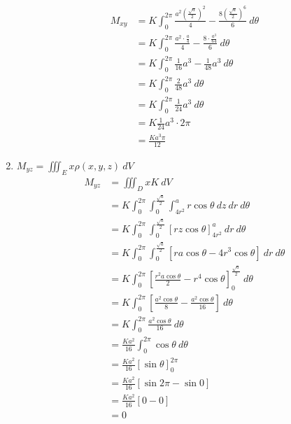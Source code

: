 \documentclass[12pt]{exam}
\begin{document}
\begin{questions}
\begin{enumerate}
    \begin{align*}
      M_{xy}
      &= K \int_0^{2\pi} \frac{a^2\left(\frac{\sqrt{a}}{2}\right)^2}{4} - \frac{8\left(\frac{\sqrt{a}}{2}\right)^6}{6}  ~ d\theta \\
      &= K \int_0^{2\pi} \frac{a^2\cdot \frac{a}{4}}{4} - \frac{8\cdot \frac{a^3}{64}}{6}  ~ d\theta \\
      &= K \int_0^{2\pi} \frac{1}{16} a ^3 - \frac{1}{48}a^3  ~ d\theta \\
      &= K \int_0^{2\pi} \frac{2}{48}a^3  ~ d\theta \\
      &= K \int_0^{2\pi} \frac{1}{24}a^3  ~ d\theta \\
      &=K \frac{1}{24}a^3  \cdot 2\pi \\
      &= \frac{K a^3 \pi}{12}
    \end{align*}

  \item $M_{yz} = \iiint_E x \rho (x,y,z) ~ dV$
    \begin{align*}
      M_{yz}
      &= \iiint_D x K ~ dV \\
      &= K \int_0^{2\pi} \int_0^{\frac{\sqrt{a}}{2}} \int_{4r^2}^a r\cos{\theta} ~ dz ~ dr ~ d\theta \\
      &= K \int_0^{2\pi} \int_0^{\frac{\sqrt{a}}{2}} \left[ rz\cos{\theta} \right]_{4r^2}^a ~ dr ~ d\theta \\
      &= K \int_0^{2\pi} \int_0^{\frac{\sqrt{a}}{2}} \left[ ra\cos{\theta} - 4r^3\cos{\theta} \right] ~ dr ~ d\theta \\
      &= K \int_0^{2\pi} \left[ \frac{r^2a\cos{\theta}}{2} - r^4\cos{\theta} \right]_0^{\frac{\sqrt{a}}{2}} ~ d\theta \\
      &= K \int_0^{2\pi} \left[ \frac{a^2\cos{\theta}}{8} - \frac{a^2\cos{\theta}}{16} \right] ~ d\theta\\
      &= K \int_0^{2\pi} \frac{a^2\cos{\theta}}{16}  ~ d\theta \\
      &= \frac{K a^2}{16} \int_0^{2\pi} \cos{\theta}  ~ d\theta \\
      &= \frac{K a^2}{16} \left[ \sin{\theta} \right]_0^{2\pi} \\
      &= \frac{K a^2}{16} \left[ \sin{2\pi} - \sin{0} \right] \\
      &= \frac{K a^2}{16} \left[ 0 - 0 \right] \\
      &= 0
    \end{align*}


\end{enumerate}
\end{questions}
\end{document}

